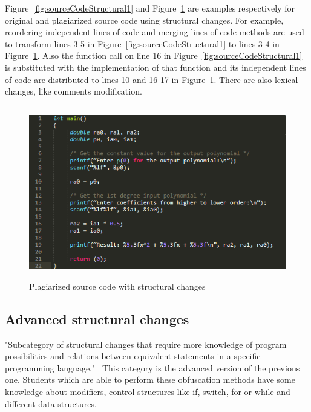 \documentclass[12pt]{article}
\begin{document}
Figure~\ref{fig:sourceCodeStructural1} and Figure~\ref{fig:sourceCodeStructural2} are examples respectively for original and plagiarized source code using structural changes. For example, reordering independent lines of code and merging lines of code methods are used to transform lines 3-5 in Figure~\ref{fig:sourceCodeStructural1} to lines 3-4 in Figure~\ref{fig:sourceCodeStructural2}. Also the function call on line 16 in Figure~\ref{fig:sourceCodeStructural1} is substituted with the implementation of that function and its independent lines of code are distributed to lines 10 and 16-17 in Figure~\ref{fig:sourceCodeStructural2}. There are also lexical changes, like comments modification.

\begin{figure} [ht]
    \centering
    \includegraphics[width=12cm, height=7.5cm]{../images/sourceCodeStructural2.png}
    \caption{Plagiarized source code with structural changes}
    \label{fig:sourceCodeStructural2}
\end{figure}



\subsection{Advanced structural changes} \label{sec:Advanced structural changes}
"Subcategory of structural changes that require more knowledge of program possibilities and relations between equivalent statements in a specific programming language."~\cite{novak} This category is the advanced version of the previous one. Students which are able to perform these obfuscation methods have some knowledge about modifiers, control structures like if, switch, for or while and different data structures.
\end{document}
